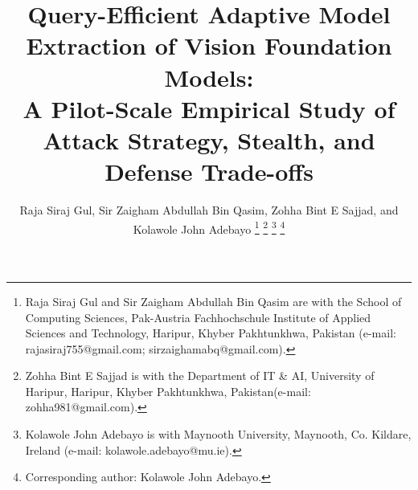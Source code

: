 \documentclass[journal,10pt]{IEEEtran}
\begin{document}
\title{Query-Efficient Adaptive Model Extraction of Vision Foundation Models:\\
A Pilot-Scale Empirical Study of Attack Strategy, Stealth, and Defense Trade-offs}

\author{
Raja Siraj Gul,
Sir Zaigham Abdullah Bin Qasim,
Zohha Bint E Sajjad, 
and Kolawole John Adebayo 
\thanks{
Raja Siraj Gul and Sir Zaigham Abdullah Bin Qasim are with the School of Computing Sciences, Pak-Austria Fachhochschule Institute of Applied Sciences and Technology, Haripur, Khyber Pakhtunkhwa, Pakistan (e-mail: rajasiraj755@gmail.com; sirzaighamabq@gmail.com).
}
\thanks{
Zohha Bint E Sajjad is with the Department of IT \& AI, University of Haripur, Haripur, Khyber Pakhtunkhwa, Pakistan(e-mail: zohha981@gmail.com).
}
\thanks{
Kolawole John Adebayo is with Maynooth University, Maynooth, Co. Kildare, Ireland (e-mail: kolawole.adebayo@mu.ie).
}
\thanks{Corresponding author: Kolawole John Adebayo.}
}

{}

\maketitle
\end{document}
